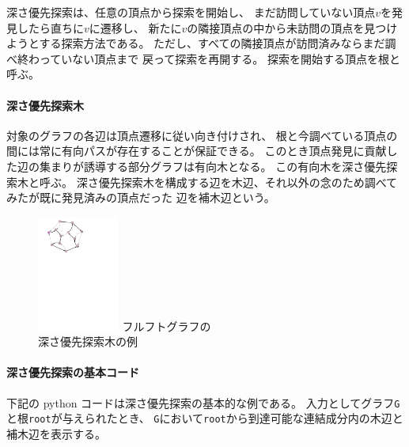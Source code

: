 \begin{paracol}{2}

深さ優先探索は、任意の頂点から探索を開始し、
まだ訪問していない頂点$v$を発見したら直ちに$v$に遷移し、
新たに$v$の隣接頂点の中から未訪問の頂点を見つけようとする探索方法である。
ただし、すべての隣接頂点が訪問済みならまだ調べ終わっていない頂点まで
戻って探索を再開する。
探索を開始する頂点を根と呼ぶ。

\paragraph{深さ優先探索木}
対象のグラフの各辺は頂点遷移に従い向き付けされ、
根と今調べている頂点の間には常に有向パスが存在することが保証できる。
このとき頂点発見に貢献した辺の集まりが誘導する部分グラフは有向木となる。
この有向木を深さ優先探索木と呼ぶ。
深さ優先探索木を構成する辺を木辺、それ以外の念のため調べてみたが既に発見済みの頂点だった
辺を補木辺という。


\switchcolumn
\vspace{-2.\intextsep}
\begin{figure}[ht]
\centering
\includegraphics[width=0.24\textwidth]{figures/dfs_frucht2.pdf}
{\small フルフトグラフの\\深さ優先探索木の例}
\end{figure}
\end{paracol}



\paragraph{深さ優先探索の基本コード}
下記の python コードは深さ優先探索の基本的な例である。
入力としてグラフ{\tt G}と根{\tt root}が与えられたとき、
{\tt G}において{\tt root}から到達可能な連結成分内の木辺と補木辺を表示する。

